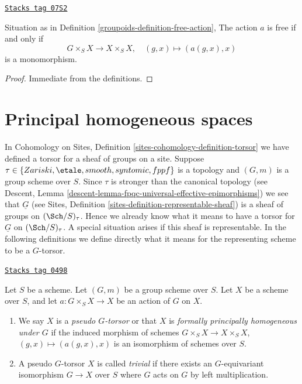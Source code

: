 \begin{lemma}
\label{groupoids-lemma-free-action}
\href{https://stacks.math.columbia.edu/tag/07S2}{\texttt{Stacks tag 07S2}}

Situation as in Definition \ref{groupoids-definition-free-action},
The action $a$ is free if and only if
$$
G \times_S X \to X \times_S X, \quad (g, x) \mapsto (a(g, x), x)
$$
is a monomorphism.
\end{lemma}

\begin{proof}
Immediate from the definitions.
\end{proof}

\section{Principal homogeneous spaces}
\label{groupoids-section-principal-homogeneous}
In
Cohomology on Sites, Definition \ref{sites-cohomology-definition-torsor}
we have defined a torsor for a sheaf of groups on a site.
Suppose $\tau \in \{Zariski, \etale, smooth, syntomic, fppf\}$ is a
topology and $(G, m)$ is a group scheme over $S$. Since $\tau$ is stronger than
the canonical topology (see
Descent, Lemma \ref{descent-lemma-fpqc-universal-effective-epimorphisms})
we see that $\underline{G}$ (see
Sites, Definition \ref{sites-definition-representable-sheaf})
is a sheaf of groups on $(\Sch/S)_\tau$.
Hence we already know what it means to have a
torsor for $\underline{G}$ on $(\Sch/S)_\tau$. A special situation
arises if this sheaf is representable. In the following definitions
we define directly what it means for the representing scheme to be a
$G$-torsor.

\begin{definition}
\label{groupoids-definition-pseudo-torsor}
\href{https://stacks.math.columbia.edu/tag/0498}{\texttt{Stacks tag 0498}}

Let $S$ be a scheme.
Let $(G, m)$ be a group scheme over $S$.
Let $X$ be a scheme over $S$, and let
$a : G \times_S X \to X$ be an action of $G$ on $X$.
\begin{enumerate}
\item We say $X$ is a {\it pseudo $G$-torsor} or that $X$ is
{\it formally principally homogeneous under $G$} if the induced
morphism of schemes $G \times_S X \to X \times_S X$,
$(g, x) \mapsto (a(g, x), x)$ is an isomorphism of schemes over $S$.
\item A pseudo $G$-torsor $X$ is called {\it trivial} if there exists
an $G$-equivariant isomorphism $G \to X$ over $S$ where $G$ acts on
$G$ by left multiplication.
\end{enumerate}
\end{definition}

